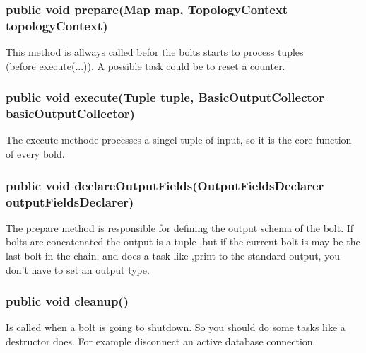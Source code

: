 \subsubsection{public void prepare(Map map, TopologyContext topologyContext)}
This method is allways called befor the bolts starts to process tuples\\ (before execute(...)).
A possible task could be to reset a counter.


\subsubsection{public void execute(Tuple tuple, BasicOutputCollector basicOutputCollector)}
The execute methode processes a singel tuple of input, so it is the core function of every bold.

\subsubsection{public void declareOutputFields(OutputFieldsDeclarer outputFieldsDeclarer)}
The prepare method is responsible for defining the output schema of the bolt.
If bolts are concatenated the output is a tuple ,but if the current bolt is may be the last bolt in the chain,
and does a task like ,print to the standard output, you don't have to set an output type.

\subsubsection{public void cleanup()}
Is called when a bolt is going to shutdown. So you should do some tasks like a destructor does.
For example disconnect an active database connection.
